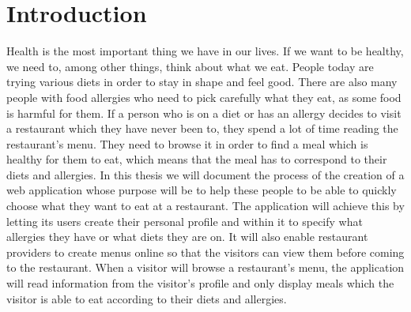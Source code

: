 \chapter*{Introduction}

Health is the most important thing we have in our lives.
If we want to be healthy, we need to, among other things, think about what we eat.
People today are trying various diets in order to stay in shape and feel good.
There are also many people with food allergies who need to pick carefully what they eat, as some food is harmful for them. 
If a person who is on a diet or has an allergy decides to visit a restaurant which they have never been to, they spend a lot of time reading the restaurant's menu. 
They need to browse it in order to find a meal which is healthy for them to eat, which means that the meal has to correspond to their diets and allergies.
In this thesis we will document the process of the creation of a web application whose purpose will be to help these people to be able to quickly choose what they want to eat at a restaurant. 
The application will achieve this by letting its users create their personal profile and within it to specify what allergies they have or what diets they are on. 
It will also enable restaurant providers to create menus online so that the visitors can view them before coming to the restaurant.
When a visitor will browse a restaurant's menu, the application will read information from the visitor's profile and only display meals which the visitor is able to eat according to their diets and allergies.

